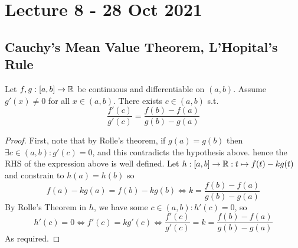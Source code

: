 \section{Lecture 8 - 28 Oct 2021}
\subsection{Cauchy's Mean Value Theorem, L'Hopital's Rule}
\begin{theorem}
  Let $f,g:[a,b]\to\mathbb R$ be continuous and differentiable on $(a,b)$. Assume $g'(x)\neq 0$
  for all $x\in (a,b)$. There exists $c\in (a,b)$ s.t. 
  \[\frac{f'(c)}{g'(c)}=\frac{f(b)-f(a)}{g(b)-g(a)}\]
  \label{<+label+>}
\end{theorem}
\begin{proof}
  First, note that by Rolle's theorem, if $g(a)=g(b)$ then $\exists c\in(a,b) :  g'(c)=0$,
  and this contradicts the hypothesis above.  hence the RHS of the expression above is
  well defined. Let $h:[a,b]\to\mathbb R: t\mapsto f(t)-kg(t)$ and constrain to $h(a)=h(b)$ so 
  \[f(a)-kg(a)=f(b)-kg(b) \iff k= \frac{f(b) - f(a)}{g(b)-g(a)}\]
  By Rolle's Theorem in $h$, we have some $c\in(a,b) : h'(c)=0$, so 
  \[h'(c)=0 \iff f'(c)=kg'(c) \iff \frac{f'(c)}{g'(c)}=k=\frac{f(b) - f(a)}{g(b)-g(a)}\]
  As required.
\end{proof}

